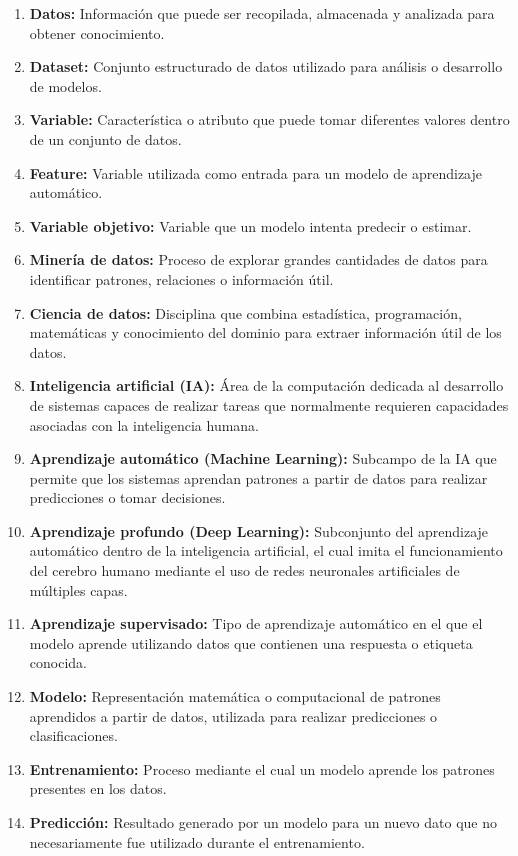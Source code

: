 \begin{enumerate}
  \item \textbf{Datos:} Información que puede ser recopilada, almacenada y analizada para obtener conocimiento.
  \item \textbf{Dataset:} Conjunto estructurado de datos utilizado para análisis o desarrollo de modelos.
  \item \textbf{Variable:} Característica o atributo que puede tomar diferentes valores dentro de un conjunto de datos.
  \item \textbf{Feature:} Variable utilizada como entrada para un modelo de aprendizaje automático.
  \item \textbf{Variable objetivo:} Variable que un modelo intenta predecir o estimar.
  \item \textbf{Minería de datos:} Proceso de explorar grandes cantidades de datos para identificar patrones, relaciones o información útil.
  \item \textbf{Ciencia de datos:} Disciplina que combina estadística, programación, matemáticas y conocimiento del dominio para extraer información útil de los datos.
  \item \textbf{Inteligencia artificial (IA):} Área de la computación dedicada al desarrollo de sistemas capaces de realizar tareas que normalmente requieren capacidades asociadas con la inteligencia humana.
  \item \textbf{Aprendizaje automático (Machine Learning):} Subcampo de la IA que permite que los sistemas aprendan patrones a partir de datos para realizar predicciones o tomar decisiones.
  \item \textbf{Aprendizaje profundo (Deep Learning):} Subconjunto del aprendizaje automático dentro de la inteligencia artificial, el cual imita el funcionamiento del cerebro humano mediante el uso de redes neuronales artificiales de múltiples capas.
  \item \textbf{Aprendizaje supervisado:} Tipo de aprendizaje automático en el que el modelo aprende utilizando datos que contienen una respuesta o etiqueta conocida.
  \item \textbf{Modelo:} Representación matemática o computacional de patrones aprendidos a partir de datos, utilizada para realizar predicciones o clasificaciones.
  \item \textbf{Entrenamiento:} Proceso mediante el cual un modelo aprende los patrones presentes en los datos.
  \item \textbf{Predicción:} Resultado generado por un modelo para un nuevo dato que no necesariamente fue utilizado durante el entrenamiento.

\end{enumerate}
